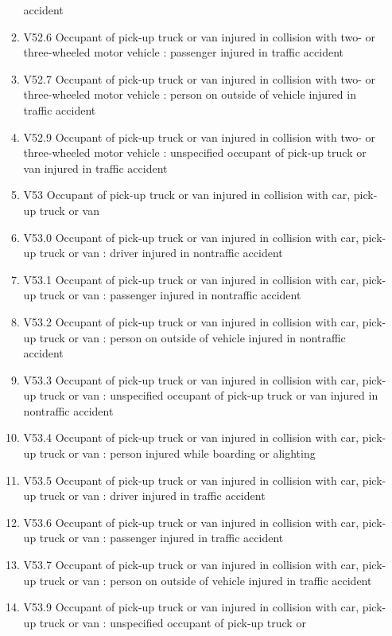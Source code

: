 \documentclass[
]{scrartcl}
\begin{document}
\begin{itemize}
\begin{enumerate}
    accident
  \item
    V52.6 Occupant of pick-up truck or van injured in collision with
    two- or three-wheeled motor vehicle : passenger injured in traffic
    accident
  \item
    V52.7 Occupant of pick-up truck or van injured in collision with
    two- or three-wheeled motor vehicle : person on outside of vehicle
    injured in traffic accident
  \item
    V52.9 Occupant of pick-up truck or van injured in collision with
    two- or three-wheeled motor vehicle : unspecified occupant of
    pick-up truck or van injured in traffic accident
  \item
    V53 Occupant of pick-up truck or van injured in collision with car,
    pick-up truck or van
  \item
    V53.0 Occupant of pick-up truck or van injured in collision with
    car, pick-up truck or van : driver injured in nontraffic accident
  \item
    V53.1 Occupant of pick-up truck or van injured in collision with
    car, pick-up truck or van : passenger injured in nontraffic accident
  \item
    V53.2 Occupant of pick-up truck or van injured in collision with
    car, pick-up truck or van : person on outside of vehicle injured in
    nontraffic accident
  \item
    V53.3 Occupant of pick-up truck or van injured in collision with
    car, pick-up truck or van : unspecified occupant of pick-up truck or
    van injured in nontraffic accident
  \item
    V53.4 Occupant of pick-up truck or van injured in collision with
    car, pick-up truck or van : person injured while boarding or
    alighting
  \item
    V53.5 Occupant of pick-up truck or van injured in collision with
    car, pick-up truck or van : driver injured in traffic accident
  \item
    V53.6 Occupant of pick-up truck or van injured in collision with
    car, pick-up truck or van : passenger injured in traffic accident
  \item
    V53.7 Occupant of pick-up truck or van injured in collision with
    car, pick-up truck or van : person on outside of vehicle injured in
    traffic accident
  \item
    V53.9 Occupant of pick-up truck or van injured in collision with
    car, pick-up truck or van : unspecified occupant of pick-up truck or

\end{enumerate}
\end{itemize}
\end{document}
